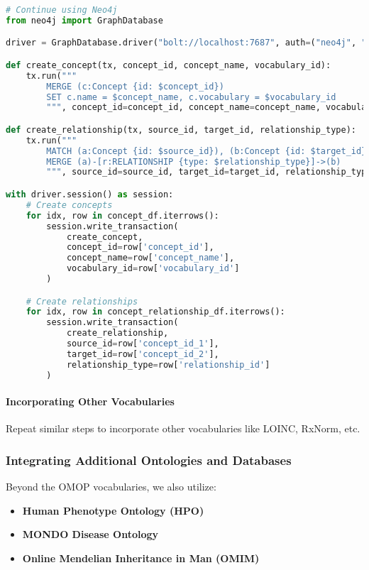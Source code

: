 \documentclass[12pt, a4paper]{article}
\begin{document}
\begin{lstlisting}[language=Python]
# Continue using Neo4j
from neo4j import GraphDatabase

driver = GraphDatabase.driver("bolt://localhost:7687", auth=("neo4j", "password"))

def create_concept(tx, concept_id, concept_name, vocabulary_id):
    tx.run("""
        MERGE (c:Concept {id: $concept_id})
        SET c.name = $concept_name, c.vocabulary = $vocabulary_id
        """, concept_id=concept_id, concept_name=concept_name, vocabulary_id=vocabulary_id)

def create_relationship(tx, source_id, target_id, relationship_type):
    tx.run("""
        MATCH (a:Concept {id: $source_id}), (b:Concept {id: $target_id})
        MERGE (a)-[r:RELATIONSHIP {type: $relationship_type}]->(b)
        """, source_id=source_id, target_id=target_id, relationship_type=relationship_type)

with driver.session() as session:
    # Create concepts
    for idx, row in concept_df.iterrows():
        session.write_transaction(
            create_concept,
            concept_id=row['concept_id'],
            concept_name=row['concept_name'],
            vocabulary_id=row['vocabulary_id']
        )

    # Create relationships
    for idx, row in concept_relationship_df.iterrows():
        session.write_transaction(
            create_relationship,
            source_id=row['concept_id_1'],
            target_id=row['concept_id_2'],
            relationship_type=row['relationship_id']
        )
\end{lstlisting}

\paragraph{Incorporating Other Vocabularies}

Repeat similar steps to incorporate other vocabularies like LOINC, RxNorm, etc.

\subsubsection{Integrating Additional Ontologies and Databases}

Beyond the OMOP vocabularies, we also utilize:

\begin{itemize}
    \item \textbf{Human Phenotype Ontology (HPO)}
    \item \textbf{MONDO Disease Ontology}
    \item \textbf{Online Mendelian Inheritance in Man (OMIM)}
\end{itemize}
\end{document}
